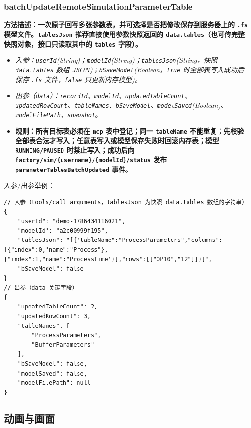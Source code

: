 \subsubsection{batchUpdateRemoteSimulationParameterTable}
\bf{方法描述}：一次原子回写多张参数表，并可选择是否把修改保存到服务器上的 \texttt{.fs} 模型文件。\texttt{tablesJson} 推荐直接使用参数快照返回的 \texttt{data.tables}（也可传完整快照对象，接口只读取其中的 \texttt{tables} 字段）。
\begin{itemize}
	\item \it{入参}：\texttt{userId}(String)；\texttt{modelId}(String)；\texttt{tablesJson}(String，快照 \texttt{data.tables} 数组 JSON)；\texttt{bSaveModel}(Boolean，\texttt{true} 时全部表写入成功后保存 \texttt{.fs} 文件，\texttt{false} 只更新内存模型)。
	\item \it{出参}（\texttt{data}）：\texttt{recordId}、\texttt{modelId}、\texttt{updatedTableCount}、\texttt{updatedRowCount}、\texttt{tableNames}、\texttt{bSaveModel}、\texttt{modelSaved}(Boolean)、\texttt{modelFilePath}、\texttt{snapshot}。
	\item \bf{规则}：所有目标表必须在 \texttt{mcp} 表中登记；同一 \texttt{tableName} 不能重复；先校验全部表合法才写入；任意表写入或模型保存失败时回滚内存表；模型 \texttt{RUNNING/PAUSED} 时禁止写入；成功后向 \texttt{factory/sim/\{username\}/\{modelId\}/status} 发布 \texttt{parameterTablesBatchUpdated} 事件。
\end{itemize}
入参/出参举例：
\begin{lstlisting}
// 入参（tools/call arguments，tablesJson 为快照 data.tables 数组的字符串）
{
    "userId": "demo-1786434116021",
    "modelId": "a2c00999f195",
    "tablesJson": "[{"tableName":"ProcessParameters","columns":[{"index":0,"name":"Process"},{"index":1,"name":"ProcessTime"}],"rows":[["OP10","12"]]}]",
    "bSaveModel": false
}
// 出参（data 关键字段）
{
    "updatedTableCount": 2,
    "updatedRowCount": 3,
    "tableNames": [
        "ProcessParameters",
        "BufferParameters"
    ],
    "bSaveModel": false,
    "modelSaved": false,
    "modelFilePath": null
}
\end{lstlisting}\vspace{-30pt}

\subsection{动画与画面}
